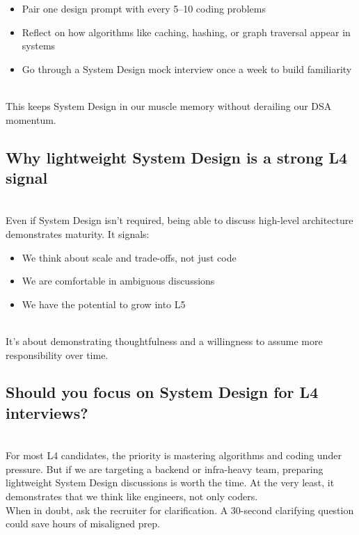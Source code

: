 \begin{itemize}
\item
\protect{}\label{FvcfCJUcxQq-ihWAAddPt}
Pair one design prompt with every 5--10 coding problems
\item
\protect{}\label{yWN-_ApIGpotTsO9NjlmT}
Reflect on how algorithms like caching, hashing, or graph traversal appear in systems
\item
\protect{}\label{0YYw1fcYpKkNWOeGGNoRu}
Go through a System Design mock interview once a week to build familiarity
\end{itemize}
\\
This keeps System Design in our muscle memory without derailing our DSA momentum.

\subsection{Why lightweight System Design is a strong L4 signal}\label{5Wa-CChRoQoDfVUPMkq5G}
\\
Even if System Design isn't required, being able to discuss high-level architecture demonstrates maturity. It signals:

\begin{itemize}
\item
\protect{}\label{bMVc4XYTgkCdYQ29g9ZBT}
We think about scale and trade-offs, not just code
\item
\protect{}\label{2wFlFY6NBAvPQwcO2ngNG}
We are comfortable in ambiguous discussions
\item
\protect{}\label{obZmN1rkHIUnZiu89yKzp}
We have the potential to grow into L5
\end{itemize}
\\
It's about demonstrating thoughtfulness and a willingness to assume more responsibility over time.

\subsection{Should you focus on System Design for L4 interviews?}\label{emR9-VFYD-1Nda641G0uF}
\\
For most L4 candidates, the priority is mastering algorithms and coding under pressure. But if we are targeting a backend or infra-heavy team, preparing lightweight System Design discussions is worth the time. At the very least, it demonstrates that we think like engineers, not only coders.
\\
When in doubt, ask the recruiter for clarification. A 30-second clarifying question could save hours of misaligned prep.


